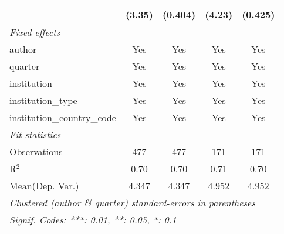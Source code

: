 \begin{tabular}{lcccc}
                                            & (3.35)     & (0.404) & (4.23)      & (0.425)\\   
   \midrule
   \emph{Fixed-effects}\\
   author                                   & Yes        & Yes     & Yes         & Yes\\  
   quarter                                  & Yes        & Yes     & Yes         & Yes\\  
   institution                              & Yes        & Yes     & Yes         & Yes\\  
   institution\_type                        & Yes        & Yes     & Yes         & Yes\\  
   institution\_country\_code               & Yes        & Yes     & Yes         & Yes\\  
   \midrule
   \emph{Fit statistics}\\
   Observations                             & 477        & 477     & 171         & 171\\  
   R$^2$                                    & 0.70       & 0.70    & 0.71        & 0.70\\  
Mean(Dep. Var.) & 4.347 & 4.347 & 4.952 & 4.952 \\
   \midrule \midrule
   \multicolumn{5}{l}{\emph{Clustered (author \& quarter) standard-errors in parentheses}}\\
   \multicolumn{5}{l}{\emph{Signif. Codes: ***: 0.01, **: 0.05, *: 0.1}}\\
\end{tabular}
\par\endgroup
